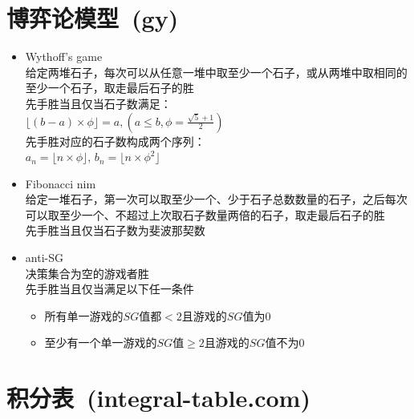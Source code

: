 \section{博弈论模型\ \small(gy)}
	\begin{itemize}[nosep,wide=0pt]
		\item Wythoff's game
			\\给定两堆石子，每次可以从任意一堆中取至少一个石子，或从两堆中取相同的至少一个石子，取走最后石子的胜
			\\先手胜当且仅当石子数满足：
			\\$\lfloor (b - a) \times \phi \rfloor=a, (a \leq b, \phi = \frac{\sqrt{5} + 1}{2})$
			\\先手胜对应的石子数构成两个序列：
			\\$a_n = \lfloor n \times \phi \rfloor$, $b_n = \lfloor n \times \phi ^ 2 \rfloor$
		\item Fibonacci nim
			\\给定一堆石子，第一次可以取至少一个、少于石子总数数量的石子，之后每次可以取至少一个、不超过上次取石子数量两倍的石子，取走最后石子的胜
			\\先手胜当且仅当石子数为斐波那契数
		\item anti-SG
			\\决策集合为空的游戏者胜
			\\先手胜当且仅当满足以下任一条件
			\begin{itemize}[nosep,wide=0pt]
				\item 所有单一游戏的$ SG $值都$ < 2 $且游戏的$ SG $值为$ 0 $
				\item 至少有一个单一游戏的$ SG $值$ \geq 2 $且游戏的$ SG $值不为$ 0 $
			\end{itemize}
	\end{itemize}
\section{积分表\ \small(integral-table.com)}
	
